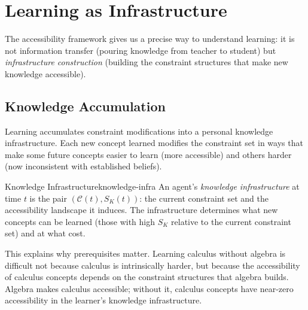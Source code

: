 \chapter{Learning as Infrastructure}



The accessibility framework gives us a precise way to understand learning:
it is not information transfer (pouring knowledge from teacher to student)
but \emph{infrastructure construction} (building the constraint structures
that make new knowledge accessible).

\section{Knowledge Accumulation}

Learning accumulates constraint modifications into a personal knowledge
infrastructure. Each new concept learned modifies the constraint set
in ways that make some future concepts easier to learn (more accessible)
and others harder (now inconsistent with established beliefs).

\begin{definition}{Knowledge Infrastructure}{knowledge-infra}
  An agent's \emph{knowledge infrastructure} at time $t$ is the pair
  $(\mathcal{C}(t), S_K(t))$: the current constraint set and the
  accessibility landscape it induces. The infrastructure determines
  what new concepts can be learned (those with high $S_K$ relative to
  the current constraint set) and at what cost.
\end{definition}

This explains why prerequisites matter. Learning calculus without algebra
is difficult not because calculus is intrinsically harder, but because
the accessibility of calculus concepts depends on the constraint
structures that algebra builds. Algebra makes calculus accessible;
without it, calculus concepts have near-zero accessibility in the
learner's knowledge infrastructure.

